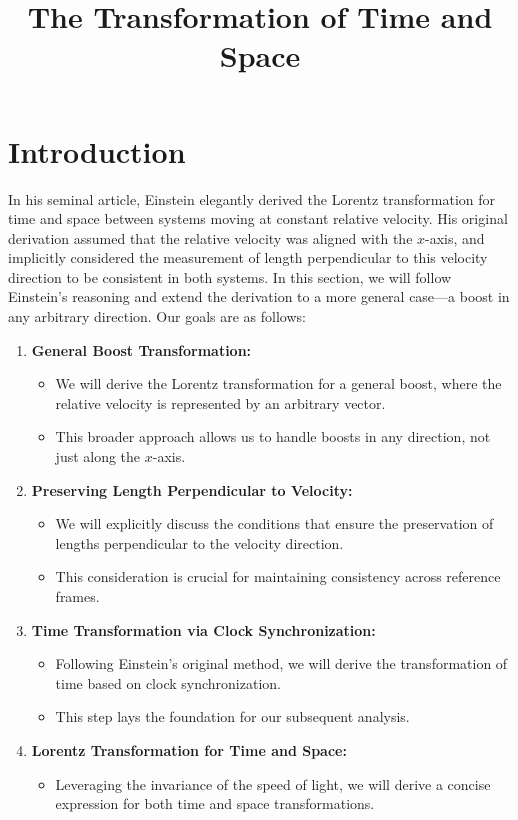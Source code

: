 \documentclass[12pt]{article}
\title{The Transformation of Time and Space}
\author{}
\date{}
\begin{document}
\maketitle
 
\section{Introduction}

In his seminal article, Einstein elegantly derived the Lorentz transformation for time and
space between systems moving at constant relative velocity. His original derivation assumed
that the relative velocity was aligned with the $x$-axis, and implicitly considered the
measurement of length perpendicular to this velocity direction to be consistent in both
systems. In this section, we will follow Einstein's reasoning and extend the derivation to a
more general case---a boost in any arbitrary direction. Our goals are as follows:

\begin{enumerate}
  \item \textbf{General Boost Transformation:}
    \begin{itemize}
      \item We will derive the Lorentz transformation for a general boost, where the relative
            velocity is represented by an arbitrary vector.
      \item This broader approach allows us to handle boosts in any direction, not just along
            the $x$-axis.
    \end{itemize}
  \item \textbf{Preserving Length Perpendicular to Velocity:}
    \begin{itemize}
      \item We will explicitly discuss the conditions that ensure the preservation of lengths
            perpendicular to the velocity direction.
      \item This consideration is crucial for maintaining consistency across reference frames.
    \end{itemize}
  \item \textbf{Time Transformation via Clock Synchronization:}
    \begin{itemize}
      \item Following Einstein's original method, we will derive the transformation of time
            based on clock synchronization.
      \item This step lays the foundation for our subsequent analysis.
    \end{itemize}
  \item \textbf{Lorentz Transformation for Time and Space:}
    \begin{itemize}
      \item Leveraging the invariance of the speed of light, we will derive a concise
            expression for both time and space transformations.
    \end{itemize}
\end{enumerate}
\end{document}
